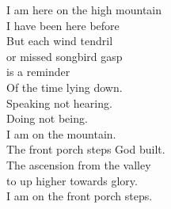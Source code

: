 I am here on the high mountain\\
I have been here before\\

But each wind tendril\\
or missed songbird gasp\\
is a reminder\\

Of the time lying down.\\
Speaking not hearing.\\
Doing not being.\\
I am on the mountain.\\

The front porch steps God built.\\
The ascension from the valley\\
to up higher towards glory.\\
I am on the front porch steps.\\

